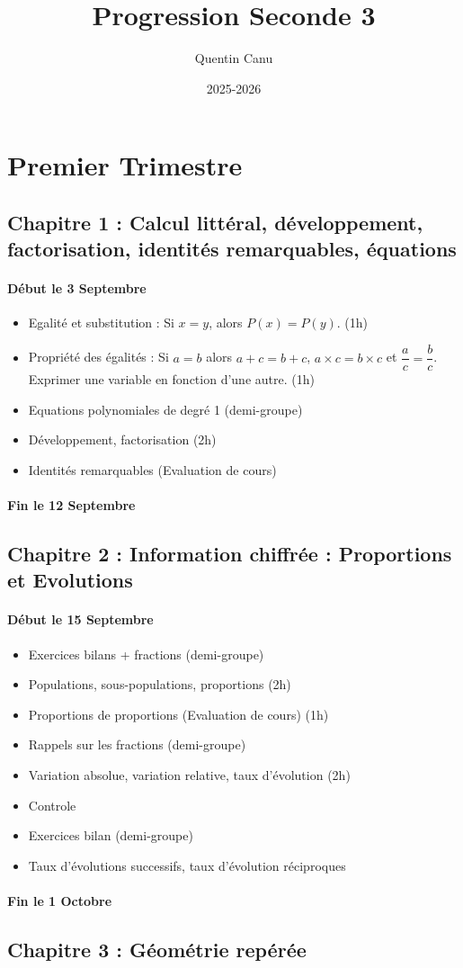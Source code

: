 \documentclass{article}
\title{Progression Seconde 3}
\date{2025-2026}
\author{Quentin Canu}
\begin{document}
\maketitle
\section{Premier Trimestre}
\subsection*{Chapitre 1 : Calcul littéral, développement, factorisation, identités remarquables, équations}
\paragraph{Début le 3 Septembre}
\begin{itemize}
\item Egalité et substitution : Si $x = y$, alors $P(x) = P(y)$. (1h)
\item Propriété des égalités : Si $a = b$ alors $a + c = b + c$, $a \times c = b \times c$ et $\dfrac{a}{c} = \dfrac{b}{c}$. Exprimer une variable en fonction d'une autre. (1h) 
\item Equations polynomiales de degré 1 (demi-groupe)
\item Développement, factorisation (2h)
\item Identités remarquables (Evaluation de cours)
\end{itemize}
\paragraph{Fin le 12 Septembre}
\subsection*{Chapitre 2 : Information chiffrée : Proportions et Evolutions}
\paragraph{Début le 15 Septembre}
\begin{itemize}
\item Exercices bilans + fractions (demi-groupe)
\item Populations, sous-populations, proportions (2h)
\item Proportions de proportions (Evaluation de cours) (1h)
\item Rappels sur les fractions (demi-groupe)
\item Variation absolue, variation relative, taux d'évolution (2h)
\item Controle
\item Exercices bilan (demi-groupe)
\item Taux d'évolutions successifs, taux d'évolution réciproques
\end{itemize}
\paragraph{Fin le 1\ier{} Octobre}
\subsection*{Chapitre 3 : Géométrie repérée}
\end{document}

